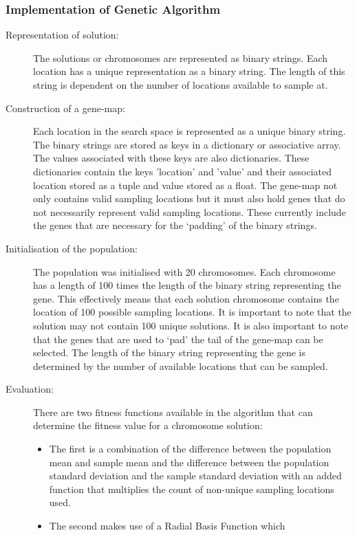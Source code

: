 \documentclass[11pt, a4paper]{article}
\numberwithin{figure}{section}
\numberwithin{table}{section}
\begin{document}
\subsubsection{Implementation of Genetic Algorithm}    
\begin{description}
  \item[Representation of solution:] 
	The solutions or chromosomes are represented as binary strings. 
	Each location has a unique representation as a binary string. 
	The length of this string is dependent on the number of locations
    available to sample at. 
  \item[Construction of a gene-map:] 
	Each location in the search space is represented as a unique binary string. 
	The binary strings are stored as keys in a dictionary or associative array. 
	The values associated with these keys are also dictionaries. 
	These dictionaries contain the keys 'location' and 'value' and their associated 
	location stored as a tuple and value stored as a float. 
	The gene-map not only contains valid sampling locations but it must also hold 
	genes that do not necessarily represent valid sampling locations. 
	These currently include the genes that are necessary for the 
    `padding' of the binary strings.
  \item[Initialisation of the population:] 
	The population was initialised with 20 chromosomes. 
	Each chromosome has a length of 100 times the length of the binary 
    string representing the gene. 	
	This effectively means that each solution chromosome contains the 
    location of 100 possible sampling locations. 
	It is important to note that the solution may not contain 100 
    unique solutions. 
	It is also important to note that the genes that are used to `pad' 
    the tail of the gene-map can be selected. 
	The length of the binary string representing the gene is determined by the 
	number of available locations that can be sampled.
  \item[Evaluation:] 
	There are two fitness functions available in the algorithm that 
	can determine the fitness value for a chromosome solution:
  \begin{itemize}
    \item The first is a combination of the difference between the population mean 
	and sample mean and the difference between the population standard deviation 
	and the sample standard deviation with an added function that multiplies 
	the count of non-unique sampling locations used.
    \item The second makes use of a Radial Basis Function which 

\end{itemize}
\end{description}
\end{document}
